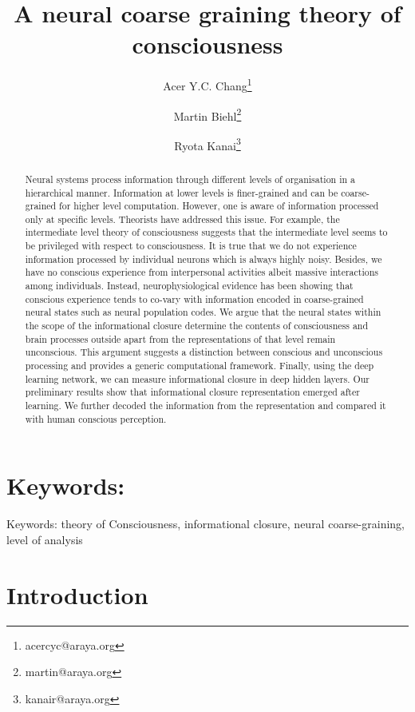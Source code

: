 \documentclass[utf8]{article}
\title{A neural coarse graining theory of consciousness}
\author[1]{Acer Y.C. Chang\thanks{acercyc@araya.org}}
\author[1]{Martin Biehl\thanks{martin@araya.org}}
\author[1]{Ryota Kanai\thanks{kanair@araya.org }}
\affil[1]{ARAYA, Inc., Tokyo, Japan}
\begin{document}
	\maketitle
	\tableofcontents


	\begin{abstract}
		Neural systems process information through different levels of organisation in a hierarchical manner. Information at lower levels is finer-grained and can be coarse-grained for higher level computation. However, one is aware of information processed only at specific levels. Theorists have addressed this issue. For example, the intermediate level theory of consciousness suggests that the intermediate level seems to be privileged with respect to consciousness. It is true that we do not experience information processed by individual neurons which is always highly noisy. Besides, we have no conscious experience from interpersonal activities albeit massive interactions among individuals. Instead, neurophysiological evidence has been showing that conscious experience tends to co-vary with information encoded in coarse-grained neural states such as neural population codes. We argue that the neural states within the scope of the informational closure determine the contents of consciousness and brain processes outside apart from the representations of that level remain unconscious. This argument suggests a distinction between conscious and unconscious processing and provides a generic computational framework. Finally, using the deep learning network, we can measure informational closure in deep hidden layers. Our preliminary results show that informational closure representation emerged after learning. We further decoded the information from the representation and compared it with human conscious perception.
	\end{abstract}
	
	
	\section*{Keywords:} 
	Keywords: theory of Consciousness, informational closure, neural coarse-graining, level of analysis
	
	
	
	\section{Introduction}
	
\end{document}
